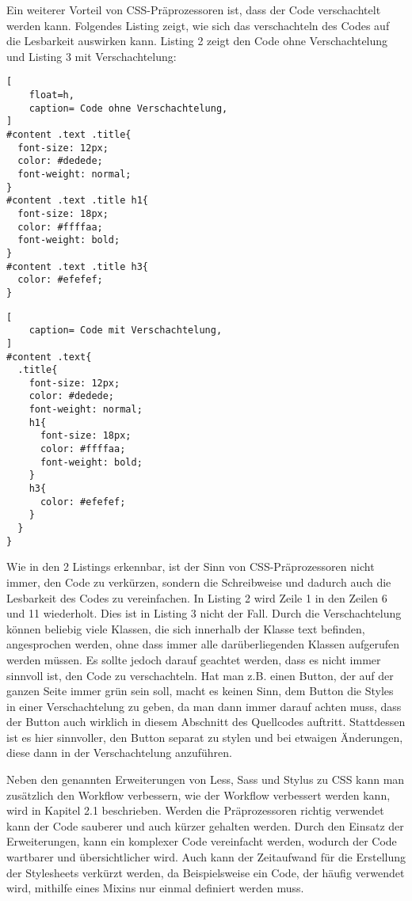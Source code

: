 Ein weiterer Vorteil von CSS-Präprozessoren ist, dass der Code verschachtelt werden kann. Folgendes Listing zeigt, wie sich das verschachteln des Codes auf die Lesbarkeit auswirken kann. Listing 2 zeigt den Code ohne Verschachtelung und Listing 3 mit Verschachtelung:\newline
\begin{lstlisting}[
	float=h,
	caption= Code ohne Verschachtelung,
]
#content .text .title{
  font-size: 12px;
  color: #dedede;
  font-weight: normal;
}
#content .text .title h1{
  font-size: 18px;
  color: #ffffaa;
  font-weight: bold;
}
#content .text .title h3{
  color: #efefef;
}
\end{lstlisting}

\begin{lstlisting}[
	caption= Code mit Verschachtelung,
]
#content .text{
  .title{
    font-size: 12px;
    color: #dedede;
    font-weight: normal;
    h1{
      font-size: 18px;
      color: #ffffaa;
      font-weight: bold;
    }
    h3{
      color: #efefef;
    }
  }
}
\end{lstlisting}

Wie in den 2 Listings erkennbar, ist der Sinn von CSS-Präprozessoren nicht immer, den Code zu verkürzen, sondern die Schreibweise und dadurch auch die Lesbarkeit des Codes zu vereinfachen. In Listing 2 wird Zeile 1 in den Zeilen 6 und 11 wiederholt. Dies ist in Listing 3 nicht der Fall. Durch die Verschachtelung können beliebig viele Klassen, die sich innerhalb der Klasse text befinden, angesprochen werden, ohne dass immer alle darüberliegenden Klassen aufgerufen werden müssen. \newline
Es sollte jedoch darauf geachtet werden, dass es nicht immer sinnvoll ist, den Code zu verschachteln. Hat man z.B. einen Button, der auf der ganzen Seite immer grün sein soll, macht es keinen Sinn, dem Button die Styles in einer Verschachtelung zu geben, da man dann immer darauf achten muss, dass der Button auch wirklich in diesem Abschnitt des Quellcodes auftritt. Stattdessen ist es hier sinnvoller, den Button separat zu stylen und bei etwaigen Änderungen, diese dann in der Verschachtelung anzuführen.

Neben den genannten Erweiterungen von Less, Sass und Stylus zu CSS kann man zusätzlich den Workflow verbessern, wie der Workflow verbessert werden kann, wird in Kapitel 2.1 beschrieben. Werden die Präprozessoren richtig verwendet kann der Code sauberer und auch kürzer gehalten werden.\newline
Durch den Einsatz der Erweiterungen, kann ein komplexer Code vereinfacht werden, wodurch der Code wartbarer und übersichtlicher wird. Auch kann der Zeitaufwand für die Erstellung der Stylesheets verkürzt werden, da Beispielsweise ein Code, der häufig verwendet wird, mithilfe eines Mixins nur einmal definiert werden muss.

